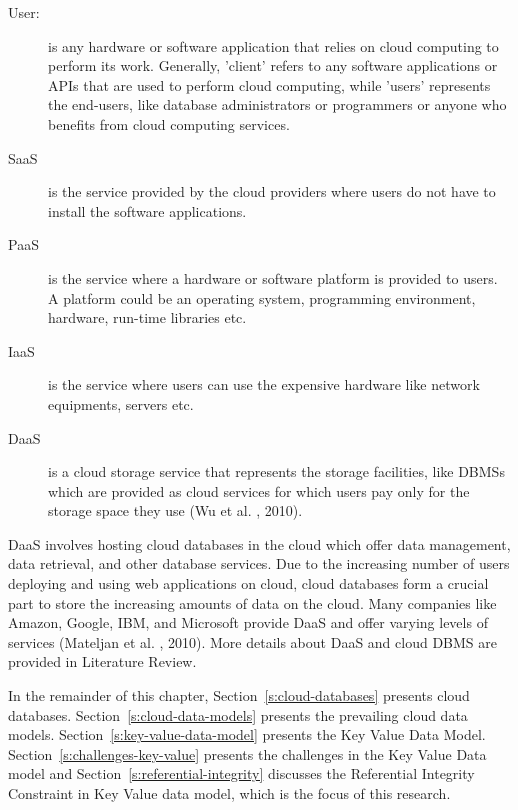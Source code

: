 \begin{description}

\item [User:] is any hardware or software application that relies on cloud
computing to perform its work.  Generally,   'client' refers to any software applications or
\acp{API}  that are used to perform cloud computing,  
while 'users' represents the end-users,   like  database administrators or
programmers or anyone who benefits from cloud computing services. 

\item [\acf{SaaS}] is the service provided by the cloud
providers where users do not have to install the software applications. 

\item [\acf{PaaS}] is the service where a hardware or
software platform is provided to users.  A platform could be an operating system,  
programming environment,   hardware,   run-time libraries etc. 

\item [\acf{IaaS}] is the service where users can use
the expensive hardware like network equipments,   servers etc. 

\item [\acf{DaaS}] is a cloud storage service  that represents
the storage facilities,   like  \acp{DBMS} which are provided
as cloud services for which users pay only for the storage space they use (Wu et
al. ,   2010). 

\end{description}


\ac{DaaS} involves hosting cloud databases in the cloud which offer data
management,   data retrieval,   and other database services.  Due to the
increasing number of users deploying and using web applications on cloud,  
cloud databases form a crucial part to store the increasing amounts of data
on the cloud.  Many companies like Amazon,   Google,   IBM,   and Microsoft
provide \ac{DaaS} and offer varying levels of services (Mateljan et al. ,   2010).  More
details about \ac{DaaS} and cloud \ac{DBMS} are provided in Literature Review. 

In the remainder of this chapter,   Section~\ref{s:cloud-databases} presents cloud
databases.  Section~\ref{s:cloud-data-models} presents the prevailing cloud data
models.  Section~\ref{s:key-value-data-model} presents the Key Value Data Model. 
Section~\ref{s:challenges-key-value} presents the challenges in the Key Value
Data model and Section~\ref{s:referential-integrity} discusses the Referential
Integrity Constraint in Key Value data model,   which is the focus of this
research. 


